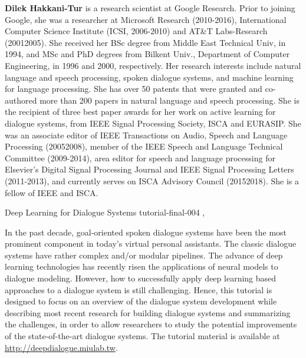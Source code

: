 \begin{bio}
  {\bfseries Dilek Hakkani-Tur} is a research scientist at Google Research. Prior to joining Google, she was a researcher at Microsoft Research (2010-2016), International Computer Science Institute (ICSI, 2006-2010) and AT\&T Labs-Research (20012005). She received her BSc degree from Middle East Technical Univ, in 1994, and MSc and PhD degrees from Bilkent Univ., Department of Computer Engineering, in 1996 and 2000, respectively. Her research interests include natural language and speech processing, spoken dialogue systems, and machine learning for language processing. She has over 50 patents that were granted and co-authored more than 200 papers in natural language and speech processing. She is the recipient of three best paper awards for her work on active learning for dialogue systems, from IEEE Signal Processing Society, ISCA and EURASIP. She was an associate editor of IEEE Transactions on Audio, Speech and Language Processing (20052008), member of the IEEE Speech and Language Technical Committee (2009-2014), area editor for speech and language processing for Elsevier’s Digital Signal Processing Journal and IEEE Signal Processing Letters (2011-2013), and currently serves on ISCA Advisory Council (20152018). She is a fellow of IEEE and ISCA. 
\end{bio}

\begin{tutorial}
  {Deep Learning for Dialogue Systems}
  {tutorial-final-004}
  {\daydateyear, \tutorialafternoontime}
  {\TutLocD}

In the past decade, goal-oriented spoken dialogue systems have been the most prominent component in today's virtual personal assistants. The classic dialogue systems have rather complex and/or modular pipelines. The advance of deep learning technologies has recently risen the applications of neural models to dialogue modeling. However, how to successfully apply deep learning based approaches to a dialogue system is still challenging. Hence, this tutorial is designed to focus on an overview of the dialogue system development while describing most recent research for building dialogue systems and summarizing the challenges, in order to allow researchers to study the potential improvements of the state-of-the-art dialogue systems. The tutorial material is available at \url{http://deepdialogue.miulab.tw}.
\end{tutorial}
